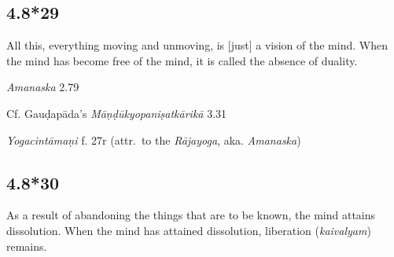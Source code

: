 \begin{ekdosis}

\subsection*{4.8*29}
\begin{translation}[hp04_008_29]
All this, everything moving and unmoving, is [just] a vision of the mind. When the mind has become free of the mind, it is called the absence of duality.
\end{translation}

\begin{sources}[hp04_008_29]
\emph{Amanaska} 2.79
\begin{versinnote}
\end{versinnote}

Cf. Gauḍapāda's \emph{Māṇḍūkyopaniṣatkārikā} 3.31
\begin{versinnote}
\end{versinnote}

\end{sources}

\begin{testimonia}[hp04_008_29]
\emph{Yogacintāmaṇi} f. 27r (attr.~to the \emph{Rājayoga}, aka. \emph{Amanaska})
\begin{versinnote}
\end{versinnote}
\end{testimonia}


\subsection*{4.8*30}
\begin{translation}[hp04_008_30]
As a result of abandoning the things that are to be known, the mind attains dissolution. When the mind has attained dissolution, liberation (\textit{kaivalyam}) remains.
\end{translation} %


\end{ekdosis}
